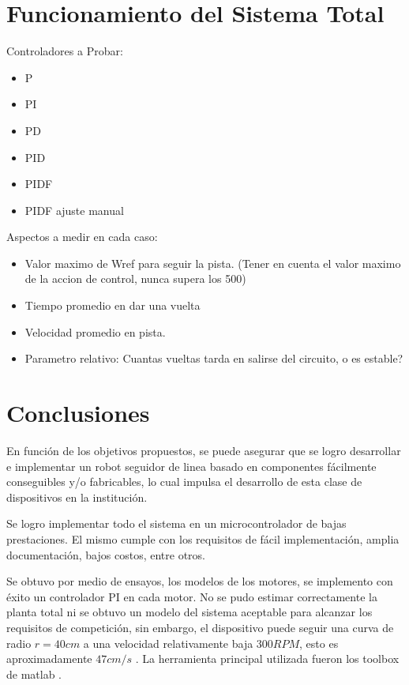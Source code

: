 \documentclass[10pt,conference,a4paper,onecolumn]{article}%
\begin{document}


\section{Funcionamiento del Sistema Total}
\label{sec:resultados}
Controladores a Probar:
\begin{itemize}
 \item P
 \item PI
 \item PD
 \item PID
 \item PIDF
 \item PIDF ajuste manual
\end{itemize}
Aspectos a medir en cada caso:
\begin{itemize}
\item Valor maximo de Wref para seguir la pista. (Tener en cuenta el valor maximo de la accion de control, nunca supera los 500)
\item Tiempo promedio en dar una vuelta
\item Velocidad promedio en pista.
\item Parametro relativo: Cuantas vueltas tarda en salirse del circuito, o es estable?
\end{itemize}



\section{Conclusiones}
\label{sec:conclusiones}
En función de los objetivos propuestos, se puede asegurar que se logro desarrollar e implementar un robot seguidor de linea basado en componentes fácilmente conseguibles y/o fabricables, lo cual impulsa el desarrollo de esta clase de dispositivos en la institución. 

Se logro implementar todo el sistema en un microcontrolador de bajas prestaciones. El mismo cumple con los requisitos de fácil implementación, amplia documentación, bajos costos, entre otros.  

Se obtuvo por medio de ensayos, los modelos de los motores, se implemento con éxito un controlador PI en cada motor. No se pudo estimar correctamente la planta total ni se obtuvo un modelo del sistema aceptable para alcanzar los requisitos de competición, sin embargo, el dispositivo puede seguir una curva de radio $r=40cm$ a una velocidad relativamente baja $300RPM$, esto es aproximadamente $47cm/s$ . La herramienta principal utilizada fueron los toolbox de matlab \cite{Sys_ident,PID_tuner}.
\end{document}
